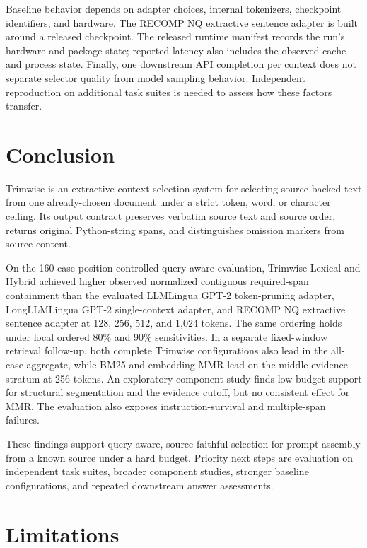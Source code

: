 \documentclass[
]{article}
\begin{document}
Baseline behavior depends on adapter choices, internal tokenizers,
checkpoint identifiers, and hardware. The RECOMP NQ extractive sentence
adapter is built around a released checkpoint. The released runtime manifest
records the run's hardware and package state; reported latency also includes
the observed cache and process state. Finally, one
downstream API completion per context does not separate selector quality
from model sampling behavior. Independent reproduction on additional
task suites is needed to assess how these factors transfer.

\section{Conclusion}\label{conclusion}

Trimwise is an extractive context-selection system for selecting
source-backed text from one already-chosen document under a strict token,
word, or character ceiling. Its output contract preserves verbatim source
text and source order, returns original Python-string spans, and
distinguishes omission markers from source content.

On the 160-case position-controlled query-aware evaluation, Trimwise
Lexical and Hybrid achieved higher observed normalized contiguous
required-span containment than the evaluated LLMLingua GPT-2
token-pruning adapter, LongLLMLingua GPT-2 single-context adapter, and
RECOMP NQ extractive sentence adapter at 128, 256, 512, and 1,024 tokens.
The same ordering holds under local ordered 80\% and 90\% sensitivities.
In a separate fixed-window retrieval follow-up, both complete Trimwise
configurations also lead in the all-case aggregate, while BM25 and embedding
MMR lead on the middle-evidence stratum at 256 tokens.
An exploratory component study finds low-budget support for structural
segmentation and the evidence cutoff, but no consistent effect for MMR.
The evaluation also exposes instruction-survival and multiple-span
failures.

These findings support query-aware, source-faithful selection for prompt
assembly from a known source under a hard budget. Priority next steps are
evaluation on independent task suites, broader component studies, stronger
baseline configurations, and repeated downstream answer assessments.

\section{Limitations}\label{limitations}
\end{document}
